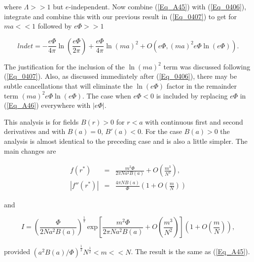 \documentclass[a4paper,twocolumn,showpacs,preprintnumbers,amsmath,amssymb]{revtex4}
\newcommand{\half}{\frac{1}{2}}
\begin{document}
\noindent
where $\Lambda >> 1$ but $e$-independent. Now combine (\ref{Eq_A45})
with (\ref{Eq_0406}), integrate and combine this with our previous
result in (\ref{Eq_0407}) to get for $ma << 1$ followed by $e\Phi >> 1$

\begin{widetext}
\begin{equation}
\label{Eq_A46}
lndet = - \frac{e \Phi}{4 \pi} \ln \left(\frac{e\Phi}{2\pi}\right)
  + \frac{e\Phi}{4 \pi} \ln (ma)^2
  + O(e\Phi, (ma)^2 e\Phi \ln (e\Phi)).
\end{equation}
\end{widetext}

\noindent
The justification for the inclusion of the $\ln (ma)^2$ term was
discussed following (\ref{Eq_0407}). Also, as discussed immediately
after (\ref{Eq_0406}), there may be subtle cancellations that will
eliminate the $\ln (e\Phi)$ factor in the remainder term
$(ma)^2 e\Phi \ln (e\Phi)$. The case when $e\Phi < 0$ is included by
replacing $e \Phi$ in (\ref{Eq_A46}) everywhere with $|e\Phi|$.

This analysis is for fields $B(r) > 0$ for $r < a$ with continuous
first and second derivatives and with $B(a) = 0$, $B'(a) < 0$. For the
case $B(a) > 0$ the analysis is almost identical to the preceding case
and is also a little simpler. The main changes are

\begin{eqnarray}
\label{Eq_A47}
f(r^{*}) &=& \frac{m^2 \Phi}{2\pi N a^2 B(a)}
  + O\left(\frac{m^3}{N^2}\right),\\
|f''(r^{*})| &=& \frac{4 \pi N B(a)}{\Phi}
   \left(1 + O\left(\frac{m}{N}\right)\right)
\end{eqnarray}

\noindent
and

\begin{widetext}
\begin{equation}
\label{Eq_A49}
I = \left( \frac{\Phi}{2 N a^2 B(a)} \right)^{\half} \, \text{exp}
  \left[
  \frac{m^2 \Phi}{2\pi N a^2 B(a)} + O\left(\frac{m^3}{N^2}\right)
  \right]
  \left( 1 + O\left(\frac{m}{N}\right) \right),
\end{equation}
\end{widetext}

\noindent
provided $(a^2 B(a) /\Phi)^{\half} N^{\half} < m << N$. The result is
the same as (\ref{Eq_A45}).
\end{document}
